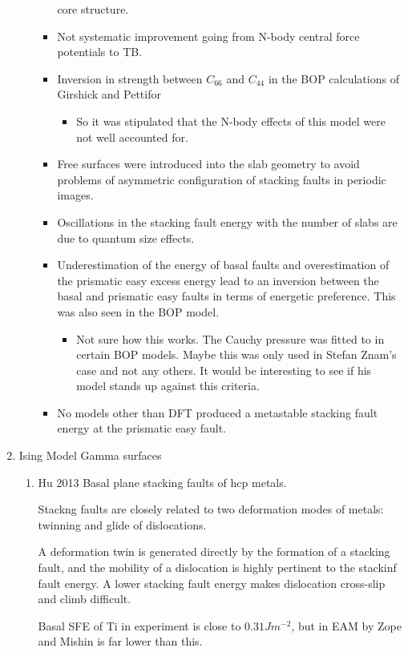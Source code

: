 \documentclass[11pt]{article}
\begin{document}
\begin{enumerate}
\begin{enumerate}
\begin{itemize}
core structure.
\item Not systematic improvement going from N-body central force potentials
to TB.
\item Inversion in strength between \(C_{66}\) and \(C_{44}\) in the BOP
calculations of Girshick and Pettifor
\begin{itemize}
\item So it was stipulated that the N-body effects of this model were not
well accounted for.
\end{itemize}
\item Free surfaces were introduced into the slab geometry to avoid problems
of asymmetric configuration of stacking faults in periodic images.
\item Oscillations in the stacking fault energy with the number of slabs are
due to quantum size effects.
\item Underestimation of the energy of basal faults and overestimation of the
prismatic easy excess energy lead to an inversion between the basal and
prismatic easy faults in terms of energetic preference. This was also
seen in the BOP model.  
\begin{itemize}
\item Not sure how this works. The Cauchy pressure was fitted to in certain
BOP models. Maybe this was only used in Stefan Znam's case and not
any others. It would be interesting to see if his model stands up
against this criteria.
\end{itemize}
\item No models other than DFT produced a metastable stacking fault energy at
the prismatic easy fault.
\end{itemize}
\end{enumerate}
\item Ising Model Gamma surfaces
\label{sec:orgb7479e1}
\begin{enumerate}
\item Hu 2013 Basal plane stacking faults of hcp metals.
\label{sec:org137fd13}
\cite{Hu2013}

Stackng faults are closely related to two deformation modes of metals: twinning
and glide of dislocations. 

A deformation twin is generated directly by the formation of a stacking fault,
and the mobility of a dislocation is highly pertinent to the stackinf fault
energy. 
A lower stacking fault energy makes dislocation cross-slip and climb
difficult. 

Basal SFE of Ti in experiment is close to \(0.31 Jm^{-2}\), but in EAM by Zope
and Mishin \cite{Zope2003} is far lower than this. 


\end{enumerate}
\end{enumerate}
\end{document}
